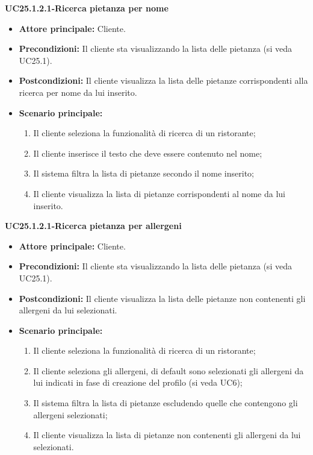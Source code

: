 \textbf{UC25.1.2.1-Ricerca pietanza per nome}
\begin{itemize}
\item \textbf{Attore principale:} Cliente.
\item \textbf{Precondizioni:}  Il cliente sta visualizzando la lista delle pietanza (si veda UC25.1).
\item \textbf{Postcondizioni:} Il cliente visualizza la lista delle pietanze corrispondenti alla ricerca per nome da lui inserito.
\item \textbf{Scenario principale:}
\begin{enumerate}
    \item Il cliente seleziona la funzionalità di ricerca di un ristorante;
    \item Il cliente inserisce il testo che deve essere contenuto nel nome;
    \item Il sistema filtra la lista di pietanze secondo il nome inserito;
    \item Il cliente visualizza la lista di pietanze corrispondenti al nome da lui inserito.
\end{enumerate}
\end{itemize}

\textbf{UC25.1.2.1-Ricerca pietanza per allergeni}
\begin{itemize}
\item \textbf{Attore principale:} Cliente.
\item \textbf{Precondizioni:}  Il cliente sta visualizzando la lista delle pietanza (si veda UC25.1).
\item \textbf{Postcondizioni:} Il cliente visualizza la lista delle pietanze non contenenti gli allergeni da lui selezionati.
\item \textbf{Scenario principale:}
\begin{enumerate}
    \item Il cliente seleziona la funzionalità di ricerca di un ristorante;
    \item Il cliente seleziona gli allergeni, di default sono selezionati gli allergeni da lui indicati in fase di creazione del profilo (si veda UC6);
    \item Il sistema filtra la lista di pietanze escludendo quelle che contengono gli allergeni selezionati;
    \item Il cliente visualizza la lista di pietanze non contenenti gli allergeni da lui selezionati.
\end{enumerate}
\end{itemize}


